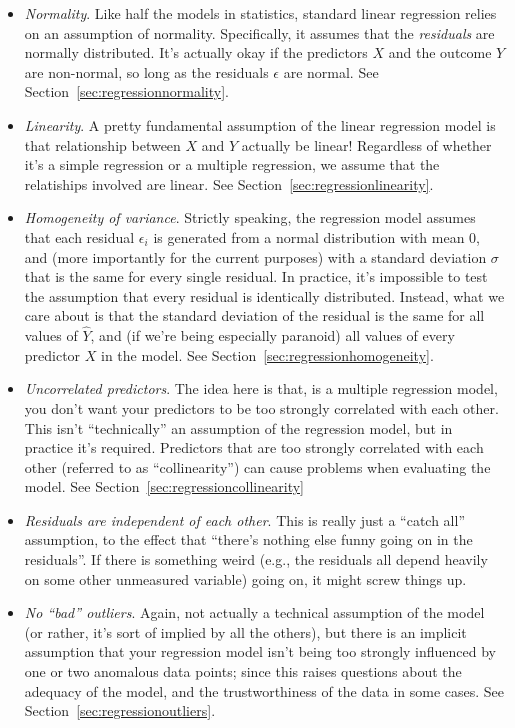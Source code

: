 \begin{itemize}
\item {\it Normality}. Like half the models in statistics, standard linear regression relies on an assumption of normality. Specifically, it assumes that the {\it residuals} are normally distributed. It's actually okay if the predictors $X$ and the outcome $Y$ are non-normal, so long as the residuals $\epsilon$ are normal. See Section~\ref{sec:regressionnormality}.
\item {\it Linearity}. A pretty fundamental assumption of the linear regression model is that relationship between $X$ and $Y$ actually be linear! Regardless of whether it's a simple regression or a multiple regression, we assume that the relatiships involved are linear. See Section~\ref{sec:regressionlinearity}.
\item {\it Homogeneity of variance}. Strictly speaking, the regression model assumes that each residual $\epsilon_i$ is generated from a normal distribution with mean 0, and (more importantly for the current purposes) with a standard deviation $\sigma$ that is the same for every single residual. In practice, it's impossible to test the assumption that every residual is identically distributed. Instead, what we care about is that the standard deviation of the residual is the same for all values of $\hat{Y}$, and (if we're being especially paranoid) all values of every predictor $X$ in the model. See Section~\ref{sec:regressionhomogeneity}.
\item {\it Uncorrelated predictors}. The idea here is that, is a multiple regression model, you don't want your predictors to be too strongly correlated with each other. This isn't  ``technically'' an assumption of the regression model, but in practice it's required. Predictors that are too strongly correlated with each other (referred to as ``collinearity'') can cause problems when evaluating the model. See Section~\ref{sec:regressioncollinearity}
\item {\it Residuals are independent of each other}. This is really just a ``catch all'' assumption, to the effect that ``there's nothing else funny going on in the residuals''. If there is something weird (e.g., the residuals all depend heavily on some other unmeasured variable) going on, it might screw things up.
\item {\it No ``bad'' outliers}. Again, not actually a technical assumption of the model (or rather, it's sort of implied by all the others), but there is an implicit assumption that your regression model isn't being too strongly influenced by one or two anomalous data points; since this raises questions about the adequacy of the model, and the trustworthiness of the data in some cases. See Section~\ref{sec:regressionoutliers}.
\end{itemize}

